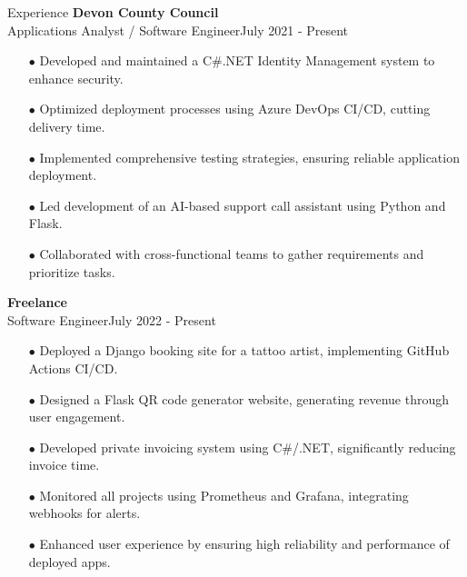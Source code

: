 \begin{rSection}{Experience}
{\bf Devon County Council} \\ 
{Applications Analyst / Software Engineer}\hfill {July 2021 - Present}
\begin{itemize}[label=\myfancylabel, leftmargin=0.5cm]
\setlength\itemsep{-0.25cm}
    \item[$\bullet$] Developed and maintained a C#.NET Identity Management system to enhance security.
    \item[$\bullet$] Optimized deployment processes using Azure DevOps CI/CD, cutting delivery time.
    \item[$\bullet$] Implemented comprehensive testing strategies, ensuring reliable application deployment.
    \item[$\bullet$] Led development of an AI-based support call assistant using Python and Flask.
    \item[$\bullet$] Collaborated with cross-functional teams to gather requirements and prioritize tasks.
\end{itemize}

{\bf Freelance} \\ 
{Software Engineer}\hfill {July 2022 - Present}
\begin{itemize}[label=\myfancylabel, leftmargin=0.5cm]
\setlength\itemsep{-0.25cm}
    \item[$\bullet$] Deployed a Django booking site for a tattoo artist, implementing GitHub Actions CI/CD.
    \item[$\bullet$] Designed a Flask QR code generator website, generating revenue through user engagement.
    \item[$\bullet$] Developed private invoicing system using C#/.NET, significantly reducing invoice time.
    \item[$\bullet$] Monitored all projects using Prometheus and Grafana, integrating webhooks for alerts.
    \item[$\bullet$] Enhanced user experience by ensuring high reliability and performance of deployed apps.
\end{itemize}

\end{rSection}